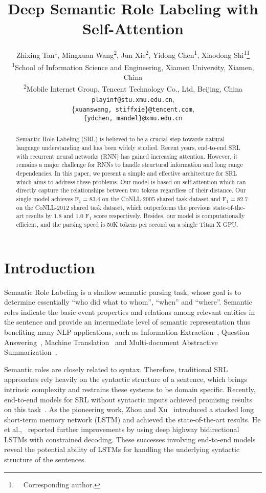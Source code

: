 \documentclass[letterpaper]{article} \usepackage{aaai18}  \usepackage{times}  \usepackage{helvet}  \usepackage{courier}  \usepackage{url}  \usepackage{graphicx}  \frenchspacing  \setlength{\pdfpagewidth}{8.5in}  \setlength{\pdfpageheight}{11in}  \usepackage{latexsym}
\title{Deep Semantic Role Labeling with Self-Attention}
\author{
Zhixing Tan\textsuperscript{1},
Mingxuan Wang\textsuperscript{2},
Jun Xie\textsuperscript{2},
Yidong Chen\textsuperscript{1},
Xiaodong Shi\textsuperscript{1}\thanks{\ \ Corresponding author.}\\
\textsuperscript{1}{School of Information Science and Engineering, Xiamen University, Xiamen, China} \\
\textsuperscript{2}{Mobile Internet Group, Tencent Technology Co., Ltd, Beijing, China} \\
\texttt{playinf@stu.xmu.edu.cn}, \\
\{\texttt{xuanswang, stiffxie}\}\texttt{@tencent.com}, \\
\texttt{\{ydchen, mandel\}@xmu.edu.cn} \\
}
\begin{document}
\maketitle

\begin{abstract}
Semantic Role Labeling (SRL) is believed to be a crucial step towards natural language understanding and has been widely studied. Recent years, end-to-end SRL with recurrent neural networks (RNN) has gained increasing attention. However, it remains a major challenge for RNNs to handle structural information and long range dependencies. In this paper, we present a simple and effective architecture for SRL which aims to address these problems. Our model is based on self-attention which can directly capture the relationships between two tokens regardless of their distance. Our single model achieves F$_1=83.4$ on the CoNLL-2005 shared task dataset and F$_1=82.7$ on the CoNLL-2012 shared task dataset, which outperforms the previous state-of-the-art results by $1.8$ and $1.0$ F$_1$ score respectively. Besides, our model is computationally efficient, and the parsing speed is 50K tokens per second on a single Titan X GPU.
\end{abstract}


\section{Introduction}
Semantic Role Labeling is a shallow semantic parsing task, whose goal is to determine essentially ``who did what to whom'', ``when'' and ``where''. Semantic roles indicate the basic event properties and relations among relevant entities in the sentence and provide an intermediate level of semantic representation thus benefiting many NLP applications, such as Information Extraction~\cite{Bastianelli-Basili-2013}, Question Answering~\cite{Surdeanu-Aarseth-ACL2003,Moschitti-Harabagiu-FLAIRS2003,Shen-Lapata-CONLL2007}, Machine Translation~\cite{knight1994building,ueffing2007transductive,wu2009semantic} and Multi-document Abstractive Summarization~\cite{genest2011framework}.

Semantic roles are closely related to syntax. Therefore, traditional SRL approaches rely heavily on the syntactic structure of a sentence, which brings intrinsic complexity and restrains these systems to be domain specific. Recently, end-to-end models for SRL without syntactic inputs achieved promising results on this task~\cite{zhou2015end,marcheggiani2017simple,he2017deep}. As the pioneering work, Zhou and Xu~ introduced a stacked long short-term memory network (LSTM) and achieved the state-of-the-art results. He et al.,~ reported further improvements by using deep highway bidirectional LSTMs with constrained decoding. These successes involving end-to-end models reveal the potential ability of LSTMs for handling the underlying syntactic structure of the sentences.
\end{document}
